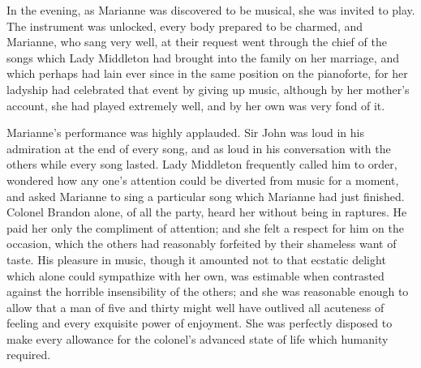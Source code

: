 In the evening, as Marianne was discovered to be musical, she was invited to play. The instrument was unlocked, every body prepared to be charmed, and Marianne, who sang very well, at their request went through the chief of the songs which Lady Middleton had brought into the family on her marriage, and which perhaps had lain ever since in the same position on the pianoforte, for her ladyship had celebrated that event by giving up music, although by her mother's account, she had played extremely well, and by her own was very fond of it.

Marianne's performance was highly applauded. Sir John was loud in his admiration at the end of every song, and as loud in his conversation with the others while every song lasted. Lady Middleton frequently called him to order, wondered how any one's attention could be diverted from music for a moment, and asked Marianne to sing a particular song which Marianne had just finished. Colonel Brandon alone, of all the party, heard her without being in raptures. He paid her only the compliment of attention; and she felt a respect for him on the occasion, which the others had reasonably forfeited by their shameless want of taste. His pleasure in music, though it amounted not to that ecstatic delight which alone could sympathize with her own, was estimable when contrasted against the horrible insensibility of the others; and she was reasonable enough to allow that a man of five and thirty might well have outlived all acuteness of feeling and every exquisite power of enjoyment. She was perfectly disposed to make every allowance for the colonel's advanced state of life which humanity required.